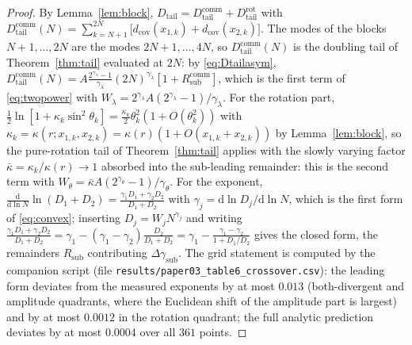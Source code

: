 \documentclass[11pt,reqno]{amsart}
\theoremstyle{plain}
\theoremstyle{definition}
\theoremstyle{remark}
\numberwithin{equation}{section}
\newcommand{\dd}{\mathrm{d}}
\newcommand{\Dtail}{D_{\mathrm{tail}}}
\begin{document}
\begin{proof}
By Lemma~\ref{lem:block}, $\Dtail=\Dtail^{\mathrm{comm}}+\Dtail^{\mathrm{rot}}$ with $\Dtail^{\mathrm{comm}}(N)=\sum_{k=N+1}^{2N}\bigl[d_{\mathrm{cov}}(x_{1,k})+d_{\mathrm{cov}}(x_{2,k})\bigr]$. The modes of the blocks $N+1,\dots,2N$ are the modes $2N+1,\dots,4N$, so $\Dtail^{\mathrm{comm}}(N)$ is the doubling tail of Theorem~\ref{thm:tail} evaluated at $2N$: by \eqref{eq:Dtailasym}, $\Dtail^{\mathrm{comm}}(N)=A\frac{2^{\gamma_\lambda}-1}{\gamma_\lambda}(2N)^{\gamma_\lambda}[1+R^{\mathrm{comm}}_{\mathrm{sub}}]$, which is the first term of \eqref{eq:twopower} with $W_\lambda=2^{\gamma_\lambda}A(2^{\gamma_\lambda}-1)/\gamma_\lambda$. For the rotation part, $\frac12\ln[1+\kappa_k\sin^2\theta_k]=\frac{\kappa_k}{2}\theta_k^2(1+O(\theta_k^2))$ with $\kappa_k=\kappa(r;x_{1,k},x_{2,k})=\kappa(r)(1+O(x_{1,k}+x_{2,k}))$ by Lemma~\ref{lem:block}, so the pure-rotation tail of Theorem~\ref{thm:tail} applies with the slowly varying factor $\bar\kappa=\kappa_k/\kappa(r)\to1$ absorbed into the sub-leading remainder: this is the second term with $W_\theta=\bar\kappa A(2^{\gamma_\theta}-1)/\gamma_\theta$. For the exponent, $\frac{\dd}{\dd\ln N}\ln(D_1+D_2)=\frac{\gamma_1D_1+\gamma_2D_2}{D_1+D_2}$ with $\gamma_j=\dd\ln D_j/\dd\ln N$, which is the first form of \eqref{eq:convex}; inserting $D_j=W_jN^{\gamma_j}$ and writing $\frac{\gamma_1D_1+\gamma_2D_2}{D_1+D_2}=\gamma_1-(\gamma_1-\gamma_2)\frac{D_2}{D_1+D_2}=\gamma_1-\frac{\gamma_1-\gamma_2}{1+D_1/D_2}$ gives the closed form, the remainders $R_{\mathrm{sub}}$ contributing $\Delta\gamma_{\mathrm{sub}}$. The grid statement is computed by the companion script (file \texttt{results/paper03\_table6\_crossover.csv}): the leading form deviates from the measured exponents by at most $0.013$ (both-divergent and amplitude quadrants, where the Euclidean shift of the amplitude part is largest) and by at most $0.0012$ in the rotation quadrant; the full analytic prediction deviates by at most $0.0004$ over all $361$ points.


\end{proof}
\end{document}
